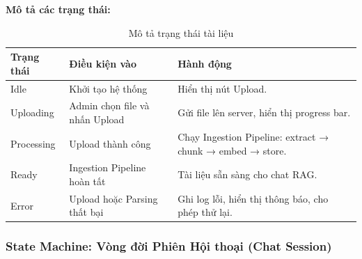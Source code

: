 \textbf{Mô tả các trạng thái:}
\begin{table}[H]
  \centering
  \caption{Mô tả trạng thái tài liệu}
  \label{tab:doc-states}
  \renewcommand{\arraystretch}{1.4}
  \begin{tabularx}{\textwidth}{|l|X|X|}
    \hline
    \rowcolor{blue!10}
    \textbf{Trạng thái} & \textbf{Điều kiện vào} & \textbf{Hành động} \\
    \hline
    Idle & Khởi tạo hệ thống & Hiển thị nút Upload. \\
    \hline
    Uploading & Admin chọn file và nhấn Upload & Gửi file lên server, hiển thị progress bar. \\
    \hline
    Processing & Upload thành công & Chạy Ingestion Pipeline: extract → chunk → embed → store. \\
    \hline
    Ready & Ingestion Pipeline hoàn tất & Tài liệu sẵn sàng cho chat RAG. \\
    \hline
    Error & Upload hoặc Parsing thất bại & Ghi log lỗi, hiển thị thông báo, cho phép thử lại. \\
    \hline
  \end{tabularx}
\end{table}

\subsubsection{State Machine: Vòng đời Phiên Hội thoại (Chat Session)}

